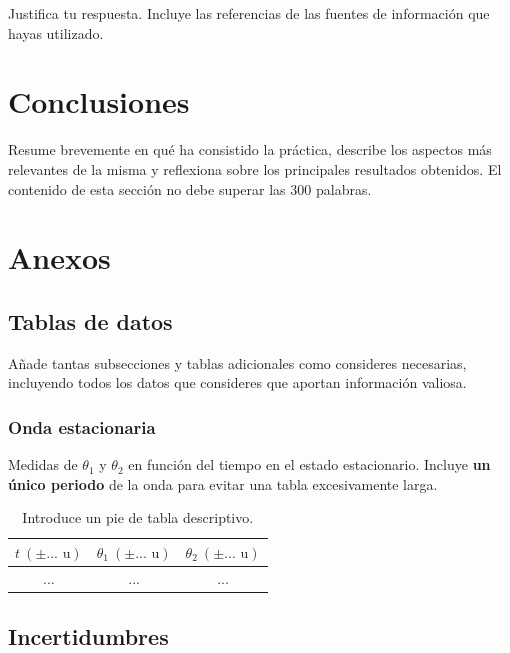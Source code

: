 
Justifica tu respuesta. Incluye las referencias de las fuentes de información que hayas utilizado.

\section{Conclusiones}

Resume brevemente en qué ha consistido la práctica, describe los aspectos más relevantes de la misma y reflexiona sobre los principales resultados obtenidos. El contenido de esta sección no debe superar las 300 palabras.

\appendix

\section{Anexos}

\subsection{Tablas de datos}

Añade tantas subsecciones y tablas adicionales como consideres necesarias, incluyendo todos los datos que consideres que aportan información valiosa.

\subsubsection{Onda estacionaria}
Medidas de $\theta_1$ y $\theta_2$ en función del tiempo en el estado estacionario. Incluye \textbf{un único periodo} de la onda para evitar una tabla excesivamente larga.

\begin{table}[ht!]
    \centering
    \begin{tabular}{c|c|c}
    $t\ (\pm ...\text{ u})$ & $\theta_1\ (\pm ...\text{ u})$ & $\theta_2\ (\pm ...\text{ u})$\\
    \hline
    ... & ... & ... \\
    \hline
    \end{tabular}
    \caption{Introduce un pie de tabla descriptivo.}
    \label{tab:R-T}
\end{table}

\subsection{Incertidumbres}


